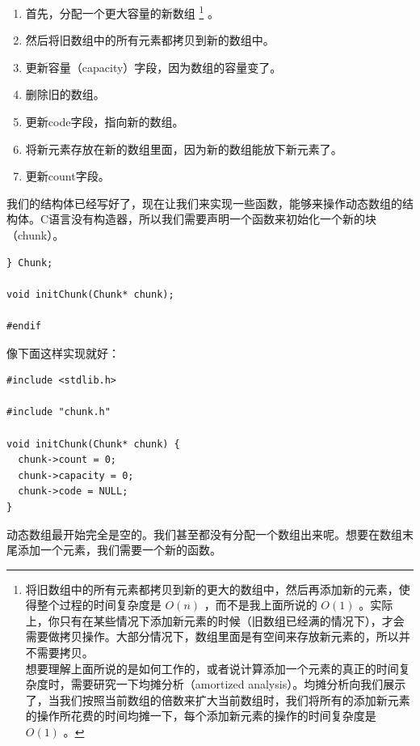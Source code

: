 \documentclass[cn,10pt,math=newtx,citestyle=gb7714-2015,bibstyle=gb7714-2015]{elegantbook}
\newenvironment{code}{\captionsetup{type=listing}}{}
\begin{document}
\begin{enumerate}
\item 首先，分配一个更大容量的新数组 \footnote{将旧数组中的所有元素都拷贝到新的更大的数组中，然后再添加新的元素，使得整个过程的时间复杂度是 $O(n)$ ，而不是我上面所说的 $O(1)$ 。实际上，你只有在某些情况下添加新元素的时候（旧数组已经满的情况下），才会需要做拷贝操作。大部分情况下，数组里面是有空间来存放新元素的，所以并不需要拷贝。 \\ 想要理解上面所说的是如何工作的，或者说计算添加一个元素的真正的时间复杂度时，需要研究一下均摊分析（amortized analysis）。均摊分析向我们展示了，当我们按照当前数组的倍数来扩大当前数组时，我们将所有的添加新元素的操作所花费的时间均摊一下，每个添加新元素的操作的时间复杂度是 $O(1)$ 。} 。
\item 然后将旧数组中的所有元素都拷贝到新的数组中。
\item 更新容量（capacity）字段，因为数组的容量变了。
\item 删除旧的数组。
\item 更新code字段，指向新的数组。
\item 将新元素存放在新的数组里面，因为新的数组能放下新元素了。
\item 更新count字段。
\end{enumerate}

我们的结构体已经写好了，现在让我们来实现一些函数，能够来操作动态数组的结构体。C语言没有构造器，所以我们需要声明一个函数来初始化一个新的块（chunk）。

\begin{code}
\begin{verbatim}
} Chunk;

void initChunk(Chunk* chunk);

#endif
\end{verbatim}
\end{code}

像下面这样实现就好：

\begin{code}
\begin{verbatim}
#include <stdlib.h>

#include "chunk.h"

void initChunk(Chunk* chunk) {
  chunk->count = 0;
  chunk->capacity = 0;
  chunk->code = NULL;
}
\end{verbatim}
\end{code}

动态数组最开始完全是空的。我们甚至都没有分配一个数组出来呢。想要在数组末尾添加一个元素，我们需要一个新的函数。
\end{document}
